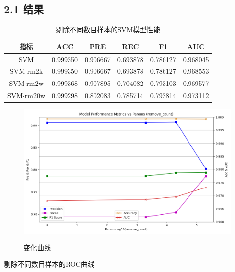\documentclass[8pt]{article}
\begin{document}
\subsection*{2.1 结果}
\begin{table}[H]
    \centering
    \caption{剔除不同数目样本的SVM模型性能}
    \begin{tabular}{cccccc}
    \toprule
    指标 & ACC & PRE & REC & F1 & AUC \\
    \midrule
    SVM & 0.999350 & 0.906667 & 0.693878 & 0.786127 & 0.968045\\
    \midrule
    SVM-rm2k & 0.999350 & 0.906667 & 0.693878 & 0.786127 & 0.968553\\
    \midrule
    SVM-rm2w & 0.999368 & 0.907895 & 0.704082 & 0.793103 & 0.969577\\
    \midrule
    SVM-rm20w & 0.999298 & 0.802083 & 0.785714 & 0.793814 & 0.973112\\
    \bottomrule
    \end{tabular}
\end{table}
\begin{figure}[H]
    \centering
    \begin{minipage}{0.55\textwidth}
        \centering
        \includegraphics[width=\textwidth]{../Prob1/out/rand_seed_14/task2/Metrics_curve_rc_0_2k_2w_20w.png}
        \label{fig:Metrics_curve_rc_0_2k_2w_20w}
        \caption{变化曲线}
    \end{minipage}
\end{figure}
剔除不同数目样本的ROC曲线
\end{document}

